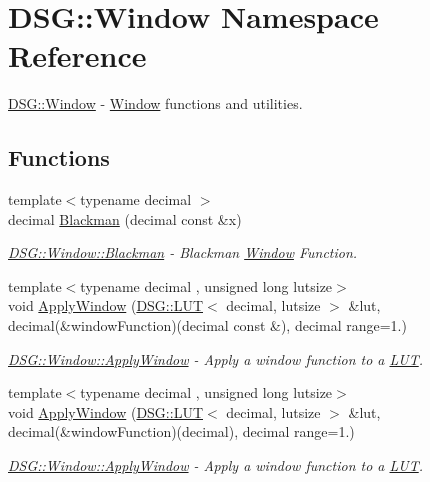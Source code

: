 \hypertarget{namespace_d_s_g_1_1_window}{\section{D\+S\+G\+:\+:Window Namespace Reference}
\label{namespace_d_s_g_1_1_window}
}


\hyperlink{namespace_d_s_g_1_1_window}{D\+S\+G\+::\+Window} -\/ \hyperlink{namespace_d_s_g_1_1_window}{Window} functions and utilities.  


\subsection*{Functions}
\begin{DoxyCompactItemize}
\item 
{\footnotesize template$<$typename decimal $>$ }\\decimal \hyperlink{namespace_d_s_g_1_1_window_a0800636ec7008aa75ff987feef5aafdf}{Blackman} (decimal const \&x)
\begin{DoxyCompactList}\small\item\em \hyperlink{namespace_d_s_g_1_1_window_a0800636ec7008aa75ff987feef5aafdf}{D\+S\+G\+::\+Window\+::\+Blackman} -\/ Blackman \hyperlink{namespace_d_s_g_1_1_window}{Window} Function. \end{DoxyCompactList}\item 
{\footnotesize template$<$typename decimal , unsigned long lutsize$>$ }\\void \hyperlink{namespace_d_s_g_1_1_window_ab3ab521b2e0d85dc752ccc42e642b203}{Apply\+Window} (\hyperlink{class_d_s_g_1_1_l_u_t}{D\+S\+G\+::\+L\+U\+T}$<$ decimal, lutsize $>$ \&lut, decimal(\&window\+Function)(decimal const \&), decimal range=1.)
\begin{DoxyCompactList}\small\item\em \hyperlink{namespace_d_s_g_1_1_window_ab3ab521b2e0d85dc752ccc42e642b203}{D\+S\+G\+::\+Window\+::\+Apply\+Window} -\/ Apply a window function to a \hyperlink{class_d_s_g_1_1_l_u_t}{L\+U\+T}. \end{DoxyCompactList}\item 
{\footnotesize template$<$typename decimal , unsigned long lutsize$>$ }\\void \hyperlink{namespace_d_s_g_1_1_window_a5e559a3fa00e81c4210043fea59d8dae}{Apply\+Window} (\hyperlink{class_d_s_g_1_1_l_u_t}{D\+S\+G\+::\+L\+U\+T}$<$ decimal, lutsize $>$ \&lut, decimal(\&window\+Function)(decimal), decimal range=1.)
\begin{DoxyCompactList}\small\item\em \hyperlink{namespace_d_s_g_1_1_window_ab3ab521b2e0d85dc752ccc42e642b203}{D\+S\+G\+::\+Window\+::\+Apply\+Window} -\/ Apply a window function to a \hyperlink{class_d_s_g_1_1_l_u_t}{L\+U\+T}. \end{DoxyCompactList}\end{DoxyCompactItemize}


